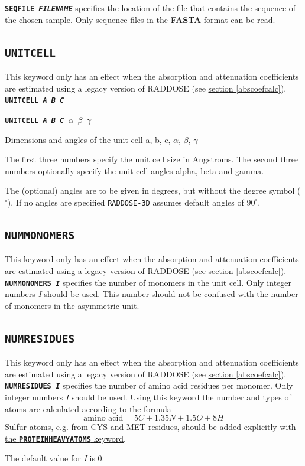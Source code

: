\documentclass[a4paper]{article}
\newcommand{\RD}{\texttt{RADDOSE-3D}\xspace}
\newcommand{\Keyword}[1]{\texttt{\textbf{#1}}\xspace}
\newcommand{\SB}{\\[0.2em]}
\newcommand{\RDLegacyKeyword}{This keyword only has an effect when the absorption and attenuation coefficients are estimated using a legacy version of RADDOSE (see \hyperref[abscoefcalc]{section \ref*{abscoefcalc}}).\SB
}
\begin{document}
\Keyword{SEQFILE \textit{FILENAME}} specifies the location of the file that contains the sequence of the chosen sample.
Only sequence files in the \href{https://en.wikipedia.org/wiki/FASTA_format}{\textbf{FASTA}} format can be read. \SB

\subsection{\Keyword{UNITCELL}}
\label{RDv3Start}
\label{unitcell}
\RDLegacyKeyword

\noindent \Keyword{UNITCELL \textit{A B C}}

\noindent \Keyword{UNITCELL \textit{A B C $\alpha$ $\beta$ $\gamma$}}

Dimensions and angles of the unit cell a, b, c, $\alpha$, $\beta$, $\gamma$

The first three numbers specify the unit cell size in Angstroms. The second three numbers optionally specify the unit cell angles alpha, beta and gamma.

The (optional) angles are to be given in degrees, but without the degree symbol ($^\circ$). If no angles are specified \RD assumes default angles of $90^\circ$.

\subsection{\Keyword{NUMMONOMERS}}
\label{nummonomers}
\RDLegacyKeyword

\noindent \Keyword{NUMMONOMERS \textit{I}}
specifies the number of monomers in the unit cell. Only integer numbers \textit{I} should be used. This number should not be confused with the number of monomers in the asymmetric unit.


\subsection{\Keyword{NUMRESIDUES}}
\label{numresidues}
\RDLegacyKeyword

\noindent \Keyword{NUMRESIDUES \textit{I}}
specifies the number of amino acid residues per monomer. Only integer numbers \textit{I} should be used. Using this keyword the number and types of atoms are calculated according to the formula
\[ \mbox{amino acid} = 5 C + 1.35 N + 1.5 O + 8 H \]
Sulfur atoms, e.g. from CYS and MET residues, should be added explicitly with \hyperref[proteinheavyatoms]{the \Keyword{PROTEINHEAVYATOMS} keyword}.

The default value for \textit{I} is 0.
\end{document}
